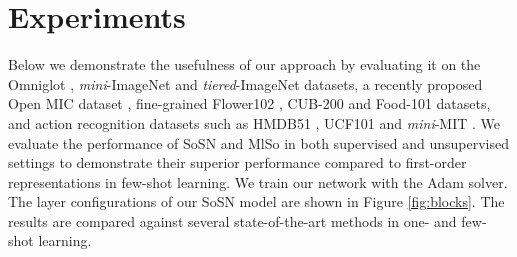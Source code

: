 \section{Experiments}

\begin{table}[t]
\centering
\caption{Evaluations on the Omniglot dataset. }
\label{table2}
\end{table}

\label{sec:exp}
Below we demonstrate the usefulness of our approach by evaluating it on the Omniglot \cite{lake_oneshot}, \textit{mini}-ImageNet \cite{vinyals2016matching} and \textit{tiered}-ImageNet \cite{ren18fewshotssl}  datasets, a recently proposed Open MIC dataset \cite{me_museum}, fine-grained  Flower102 \cite{Nilsback08}, CUB-200  \cite{WahCUB_200_2011} and Food-101 \cite{bossard14} datasets, and action recognition datasets such as HMDB51 \cite{Kuehne11}, UCF101 \cite{soomro2012ucf101} and \textit{mini}-MIT \cite{soomro2012ucf101}. We evaluate the performance of SoSN and MlSo in both supervised and unsupervised settings to demonstrate their superior performance compared to first-order representations in few-shot learning. 
We train our network with the Adam solver. The layer configurations of our SoSN model are shown in Figure \ref{fig:blocks}.  The results are compared against several state-of-the-art methods in one- and few-shot learning.


